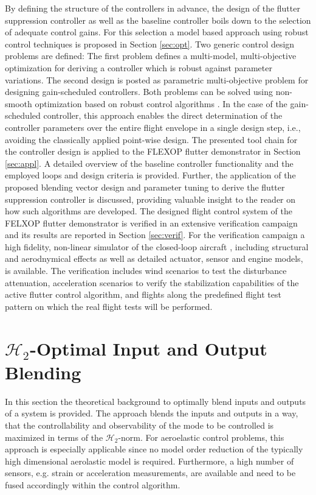 \documentclass[aerospace,article,submit,moreauthors,pdftex,10pt,a4paper]{Definitions/mdpi}
\begin{document}
By defining the structure of the controllers in advance, the design of the flutter suppression controller as well as the baseline controller boils down to the  selection of adequate control gains. For this selection a model based approach using robust control techniques is proposed in Section \ref{sec:opt}. Two generic control design problems are defined:  The first problem defines a multi-model, multi-objective optimization for deriving a controller which is robust against parameter variations. The second design is posted as parametric multi-objective problem for designing gain-scheduled controllers. Both problems can be solved using non-smooth optimization based on robust control algorithms \cite{Apkarian06}.  In the case of the gain-scheduled controller, this approach enables the direct determination of the controller parameters over the entire flight envelope in a single design step, i.e., avoiding the classically applied point-wise design. 
The presented tool chain for the controller design is applied to the FLEXOP flutter demonstrator in Section \ref{sec:appl}.
A detailed overview of the baseline controller functionality and the employed loops and design criteria is provided. Further, the application of the proposed blending vector design and parameter tuning to derive the flutter suppression controller is discussed, providing valuable insight to the reader on how such algorithms are developed.
The designed flight control system of the FELXOP flutter demonstrator is verified in an extensive verification campaign and its results are reported in Section \ref{sec:verif}. For the verification campaign a high fidelity, non-linear simulator of the closed-loop aircraft \cite{Wuestenhagen18,Meddaikar19}, including structural and aerodnymical effects as well as detailed actuator, sensor and engine models, is available.
The verification includes wind scenarios to test the disturbance attenuation, acceleration scenarios to verify the stabilization capabilities of the active flutter control algorithm, and  flights along the predefined flight test pattern on which the real flight tests will be performed.

\section{$\mathcal{H}_{2}$-Optimal Input and Output Blending}\label{sec:blend}
In this section the theoretical background to optimally blend  inputs and outputs of a system is provided. The approach blends the inputs and outputs in a way, that the controllability and observability of the mode to be controlled is maximized in terms of the $\mathcal{H}_{2}$-norm. 
For aeroelastic control problems, this approach is especially applicable since no model order reduction of the typically high dimensional aerolastic model is required. Furthermore, a high number of sensors, e.g. strain or acceleration measurements, are available and need to be fused accordingly within the control algorithm. 
\end{document}
